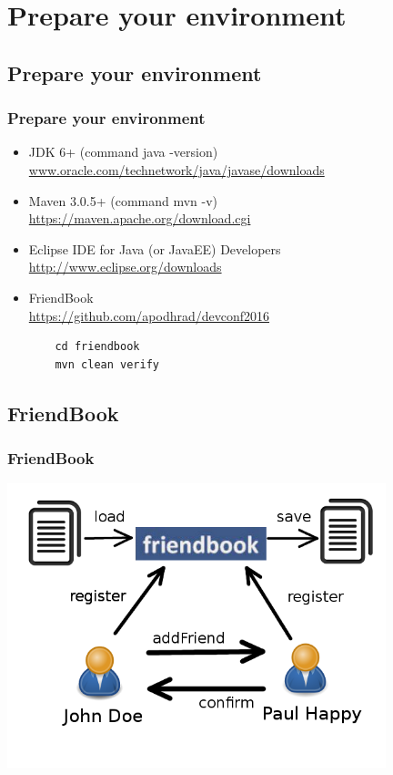 \documentclass{beamer}
\begin{document}
\section{Prepare your environment}

\subsection{Prepare your environment}
\begin{frame}[fragile]
\frametitle{Prepare your environment}
\begin{itemize}
\item JDK 6+ (command java -version)
\\\url{www.oracle.com/technetwork/java/javase/downloads}
\item Maven 3.0.5+ (command mvn -v)
  \\\url{https://maven.apache.org/download.cgi}
\item Eclipse IDE for Java (or JavaEE) Developers
\\\url{http://www.eclipse.org/downloads}
\item FriendBook
  \\\url{https://github.com/apodhrad/devconf2016}
  \begin{lstlisting}
    cd friendbook
    mvn clean verify
  \end{lstlisting}
\end{itemize}
\end{frame}

\subsection{FriendBook}
\begin{frame}[fragile]
\frametitle{FriendBook}
\begin{center}
  \includegraphics[width=11cm]{friendbook.png}
\end{center}  
\end{frame}
\end{document}

